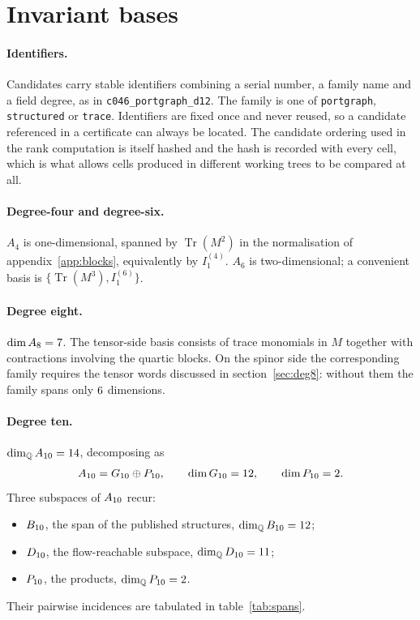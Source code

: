 \section{Invariant bases}
\label{app:bases}

\paragraph{Identifiers.}
Candidates carry stable identifiers combining a serial number, a family name and
a field degree, as in \texttt{c046\_portgraph\_d12}. The family is one of
\texttt{portgraph}, \texttt{structured} or \texttt{trace}. Identifiers are fixed once
and never reused, so a candidate referenced in a certificate can always be
located. The candidate ordering used in the rank computation is itself hashed and
the hash is recorded with every cell, which is what allows cells produced in
different working trees to be compared at all.

\paragraph{Degree-four and degree-six.}
$A_4$ is one-dimensional, spanned by $\operatorname{Tr}(M^2)$ in the normalisation
of appendix~\ref{app:blocks}, equivalently by $I^{(4)}_1$. $A_6$ is
two-dimensional; a convenient basis is $\{\operatorname{Tr}(M^3), I^{(6)}_1\}$.

\paragraph{Degree eight.}
$\dim A_8 = 7$. The tensor-side basis consists of trace monomials
in $M$ together with contractions involving the quartic blocks. On the spinor side
the corresponding family requires the tensor words discussed in
section~\ref{sec:deg8}: without them the family spans only
$6$ dimensions.

\paragraph{Degree ten.}
$\dim_{\mathbb{Q}} A_{10} = 14$, decomposing as
\begin{equation}
A_{10} = G_{10} \oplus P_{10},
\qquad
\dim G_{10} = 12,
\qquad
\dim P_{10} = 2 .
\end{equation}
Three subspaces of $A_{10}$ recur:
\begin{itemize}\itemsep2pt
\item $B_{10}$, the span of the published structures, $\dim_{\mathbb{Q}} B_{10} = 12$;
\item $D_{10}$, the flow-reachable subspace, $\dim_{\mathbb{Q}} D_{10} = 11$;
\item $P_{10}$, the products, $\dim_{\mathbb{Q}} P_{10} = 2$.
\end{itemize}
Their pairwise incidences are tabulated in table~\ref{tab:spans}.

